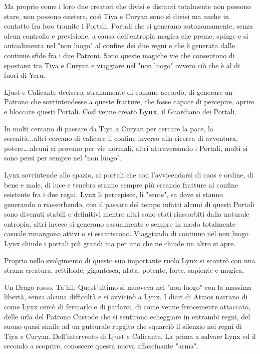 \documentclass[a4paper,11pt,twoside,openany]{book}
\begin{document}
Ma proprio come i loro due creatori che divisi e distanti totalmente non possono stare, non possono esistere, così Tiya e Curyan sono sì divisi ma anche in contatto fra loro tramite i Portali. Portali che si generano autonomamente, senza alcun controllo e previsione, a causa dell'entropia magica che preme, spinge e si autoalimenta nel "non luogo" al confine dei due regni e che è generata dalle continue sfide fra i due Patroni. Sono queste magiche vie che consentono di spostarsi tra Tiya e Curyan e viaggiare nel "non luogo" ovvero ciò che è al di fuori di Yeru.

Ljust e Calicante decisero, stranamente di comune accordo, di generare un Patrono che sovrintendesse a queste fratture, che fosse capace di percepire, aprire e bloccare questi Portali. Così venne creato \textbf{Lynx}, il Guardiano dei Portali.

In molti cercano di passare da Tiya a Curyan per cercare la pace, la serenità...altri cercano di valicare il confine inverso alla ricerca di avventura, potere\ldots .alcuni ci provano per vie normali, altri attraversando i Portali, molti si sono persi per sempre nel "non luogo".

Lynx sovrintende allo spazio, ai portali che con l'avvicendarsi di caos e ordine, di bene e male, di luce e tenebra stanno sempre più creando fratture al confine esistente fra i due regni. Lynx li percepisce, li "sente", sa dove si stanno generando o riassorbendo, con il passare del tempo infatti alcuni di questi Portali sono divenuti stabili e definitivi mentre altri sono stati riassorbiti dalla naturale entropia, altri invece si generano casualmente e sempre in modo totalmente casuale rimangono attivi o si esauriscono. Viaggiando di continuo nel non luogo Lynx chiude i portali più grandi ma per uno che ne chiude un altro si apre.

Proprio nello svolgimento di questo suo importante ruolo Lynx si scontrò con una strana creatura, rettiloide, gigantesca, alata, potente, forte, sapiente e magica.

Un Drago rosso, Ta'hil. Quest'ultimo si muoveva nel "non luogo" con la massima libertà, senza alcuna difficoltà e si avvicinò a Lynx. I diari di Atmos narrano di come Lynx cercò di fermarlo e di parlarci, di come venne ferocemente attaccato, delle urla del Patrono Custode che si sentirono echeggiare in entrambi regni, del suono quasi simile ad un gutturale ruggito che squarciò il silenzio nei regni di Tiya e Curyan. Dell'intervento di Ljust e Calicante. La prima a salvare Lynx ed il secondo a scoprire, conoscere questa nuova affascinante "arma".
\end{document}
